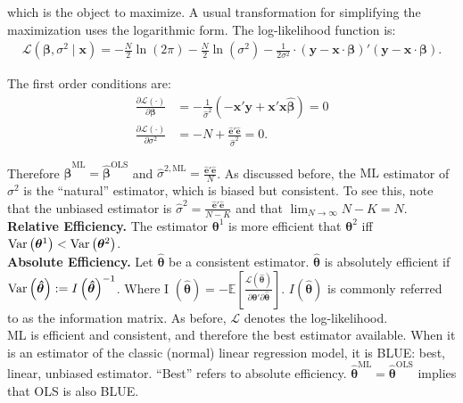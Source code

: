 \noindent which is the object to maximize. A usual transformation for simplifying the maximization uses the logarithmic form. The log-likelihood function is:
\begin{align}
	\mathcal{L} \left( \bm{\beta}, \sigma^2 \mid \bm{x} \right) = - \frac{N}{2} \ln \left( 2 \pi \right)  - \frac{N}{2} \ln \left( \sigma^2 \right) - \frac{1}{2 \sigma^2} \cdot \left( \bm{y} - \bm{x} \cdot \bm{\beta} \right)' \left( \bm{y} - \bm{x} \cdot \bm{\beta} \right). 
\end{align}

\noindent The first order conditions are: 
\begin{align}
	\frac{\partial \mathcal{L} \left( \cdot \right) }{\partial \bm{\beta} } & = -\frac{1}{ \hat{\sigma}^2 } \left( -  \bm{x}' \bm{y} +  \bm{x}' \bm{x} \bm{\hat{\beta}} \right) = 0 \nonumber \\ 
	\frac{\partial \mathcal{L} \left( \cdot \right) }{\partial \sigma^2 } & = -N + \frac{ \bm{\hat{e}}' \bm{\hat{e}} } { \hat{\sigma}^2 } = 0.
\end{align}

\noindent Therefore $\bm{\hat{\beta}}^{\text{ML}} = \bm{\hat{\beta}}^{\text{OLS}}$ and $ { \hat{\sigma}^{2, \text{ML} } } = \frac{ \bm{\hat{e}}' \bm{\hat{e}} } {N}$. As discussed before, the $\text{ML}$ estimator of $\sigma^2$ is the ``natural'' estimator, which is biased but consistent. To see this, note that the unbiased estimator is ${ \hat{\sigma}^{2} } = \frac{ \bm{\hat{e}}' \bm{\hat{e}} } {N - K}$ and that $\lim_{N \rightarrow \infty} N - K = N$.\\ 

\noindent \textbf{Relative Efficiency.} The estimator $\bm{\theta}^1$ is more efficient that $\bm{\theta}^2$ iff $\operatorname{Var} \left( \bm{\theta}^1 \right) < \operatorname{Var} \left( \bm{\theta}^2 \right)$.\\ 

\noindent \textbf{Absolute Efficiency.} Let $\bm{\hat{\theta}}$ be a consistent estimator. $\bm{\hat{\theta}}$ is absolutely efficient if $\operatorname{Var} \left( \bm{\hat{\theta}} \right) := I \left( \bm{\hat{\theta}} \right)^{-1}$. Where I $\left( \bm{\hat{\theta}} \right) =  - \mathbb{E} \left[ \frac{ \mathcal{L} \left( \bm{\hat{\theta}} \right) } { \partial \bm{\theta}' \partial \bm{ \bm{\hat{\theta}} }  } \right]$. $I \left( \bm{\hat{\theta}} \right)$ is commonly referred to as the information matrix. As before, $\mathcal{L}$ denotes the log-likelihood. \\

\noindent ML is efficient and consistent, and therefore the best estimator available. When it is an estimator of the classic (normal) linear regression model, it is BLUE: best, linear, unbiased estimator. ``Best'' refers to absolute efficiency.  $\bm{\bm{\hat{\theta}}}^{\text{ML}} = \bm{\bm{\hat{\theta}}}^{\text{OLS}}$ implies that OLS is also BLUE.\\ 

